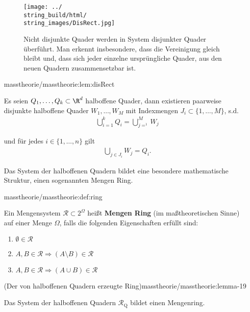 \documentclass[letterpaper,10pt,german]{jupyterBook}
\begin{document}
\begin{figure}[htbp]
\centering


\noindent\texttt{[image: ../\\string\_build/html/\\string\_images/DisRect.jpg]}
\caption{Nicht disjunkte Quader werden in System disjunkter Quader überführt. Man erkennt insbesondere, dass die Vereinigung gleich bleibt und, dass sich jeder einzelne ursprüngliche Quader, aus den neuen Quadern zusammensetzbar ist.}\label{\detokenize{masstheorie/masstheorie:fig-disrect}}\end{figure}
\begin{lemma}{}{masstheorie/masstheorie:lem:disRect}



\par
Es seien \(Q_1,\ldots,Q_k\subset\R^d\) halboffene Quader, dann existieren paarweise disjunkte halboffene Quader \(W_1,\ldots, W_M\) mit Indexmengen \(J_i\subset\{1,\ldots,M\}\), s.d.
\begin{align*}
\bigcup_{i=1}^k Q_i = \bigcup_{j=^1}^M W_j
\end{align*}
\par
und für jedes \(i\in\{1,\ldots,n\}\) gilt
\begin{align*}
\bigcup_{j\in J_i} W_j = Q_i.
\end{align*}\end{lemma}

\par
Das System der halboffenen Quadern bildet eine besondere mathematische Struktur, einen sogenannten Mengen Ring.
\begin{definition}{}{masstheorie/masstheorie:def:ring}



\par
Ein Mengensystem \(\mathcal{R} \subset 2^{\Omega}\) heißt \textbf{Mengen Ring} (im maßtheoretischen Sinne) auf einer Menge \(\Omega\), falls die folgenden Eigenschaften erfüllt sind:
\begin{enumerate}

\item {} 
\par
\(\emptyset \in \mathcal{R}\)

\item {} 
\par
\(A,B \in \mathcal{R} \Rightarrow (A \setminus B) \in \mathcal{R}\)

\item {} 
\par
\(A,B \in \mathcal{R} \Rightarrow (A \cup B) \in \mathcal{R}\)

\end{enumerate}
\end{definition}
\begin{lemma}{(Der von halboffenen Quadern erzeugte Ring)}{masstheorie/masstheorie:lemma-19}



\par
Das System der halboffenen Quadern \(\mathcal{R}_{\text{Q}}\) bildet einen Mengenring.
\end{lemma}
\end{document}
